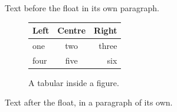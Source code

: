 \documentclass[12pt]{article}
\begin{document}
Text before the float in its own paragraph.

\begin{figure}[h]
\centering
\begin{tabular}{lcr}\hline Left & Centre & Right\\\hline one & two & three\\ four & five & six\\\hline\end{tabular}
\caption{A tabular inside a figure.}
\end{figure}

Text after the float, in a paragraph of its own.
\end{document}
